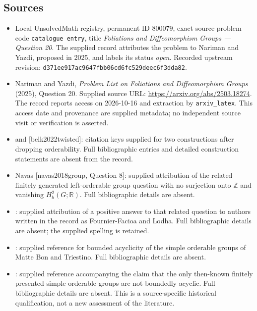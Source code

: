 \documentclass[11pt]{article}
\newcommand{\Z}{\mathbb{Z}}
\newcommand{\R}{\mathbb{R}}
\begin{document}
\subsection{Sources}
\begin{itemize}
\item Local UnsolvedMath registry, permanent ID \(800079\), exact source problem code \texttt{catalogue entry}, title \emph{Foliations and Diffeomorphism Groups --- Question 20}. The supplied record attributes the problem to Nariman and Yazdi, proposed in 2025, and labels its status \emph{open}. Recorded upstream revision: \texttt{d371ee917ac9647fbb06cd6fc529deec6f3dda82}.
\item Nariman and Yazdi, \emph{Problem List on Foliations and Diffeomorphism Groups} (2025), Question 20. Supplied source URL: \url{https://arxiv.org/abs/2503.18274}. The record reports access on 2026-10-16 and extraction by \texttt{arxiv\_latex}. This access date and provenance are supplied metadata; no independent source visit or verification is asserted.
\item [skipper2019simple] and [belk2022twisted]: citation keys supplied for two constructions after dropping orderability. Full bibliographic entries and detailed construction statements are absent from the record.
\item Navas [navas2018group, Question 8]: supplied attribution of the related finitely generated left-orderable group question with no surjection onto \(\Z\) and vanishing \(H_b^2(G;\R)\). Full bibliographic details are absent.
\item [fournier2023second]: supplied attribution of a positive answer to that related question to authors written in the record as Fournier-Facioa and Lodha. Full bibliographic details are absent; the supplied spelling is retained.
\item [campagnolo2023algebraic, Corollary 1.16]: supplied reference for bounded acyclicity of the simple orderable groups of Matte Bon and Triestino. Full bibliographic details are absent.
\item [hyde2023finitely, Corollary 1.7]: supplied reference accompanying the claim that the only then-known finitely presented simple orderable groups are not boundedly acyclic. Full bibliographic details are absent. This is a source-specific historical qualification, not a new assessment of the literature.
\end{itemize}
\end{document}
